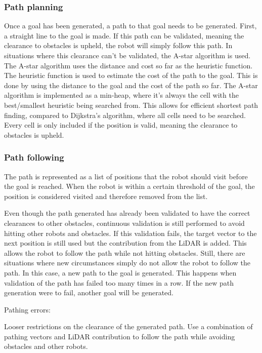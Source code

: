 \subsubsection{Path planning}\label{sec:path_planning}
Once a goal has been generated, a path to that goal needs to be generated. First, a straight line to the goal is made. If this path can be validated, meaning the clearance to obstacles is upheld, the robot will simply follow this path.
In situations where this clearance can't be validated, the A-star algorithm is used.
The A-star algorithm uses the distance and cost so far as the heuristic function. The heuristic function is used to estimate the cost of the path to the goal. This is done by using the distance to the goal and the cost of the path so far.
The A-star algorithm is implemented as a min-heap, where it's always the cell with the best/smallest heuristic being searched from. This allows for efficient shortest path finding, compared to Dijkstra's algorithm, where all cells need to be searched. Every cell is only included if the position is valid, meaning the clearance to obstacles is upheld.
\subsubsection{Path following}\label{sec:path_following}
The path is represented as a list of positions that the robot should visit before the goal is reached. When the robot is within a certain threshold of the goal, the position is considered visited and therefore removed from the list.

Even though the path generated has already been validated to have the correct clearances to other obstacles, continuous validation is still performed to avoid hitting other robots and obstacles.
If this validation fails, the target vector to the next position is still used but the contribution from the LiDAR is added. This allows the robot to follow the path while not hitting obstacles. 
Still, there are situations where new circumstances simply do not allow the robot to follow the path. In this case, a new path to the goal is generated. This happens when validation of the path has failed too many times in a row. If the new path generation were to fail, another goal will be generated.

Pathing errors:

Looser restrictions on the clearance of the generated path.
Use a combination of pathing vectors and LiDAR contribution to follow the path while avoiding obstacles and other robots.
